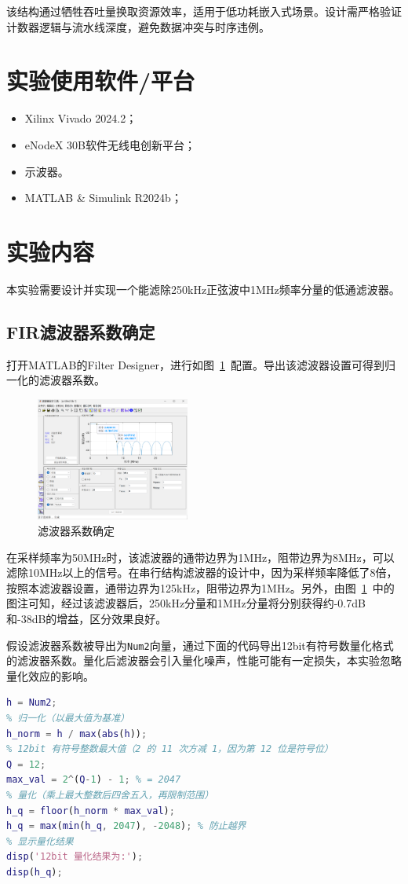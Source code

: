 该结构通过牺牲吞吐量换取资源效率，适用于低功耗嵌入式场景。设计需严格验证计数器逻辑与流水线深度，避免数据冲突与时序违例。
\section{实验使用软件/平台}
\begin{itemize}
    \item Xilinx Vivado 2024.2；
    \item eNodeX 30B软件无线电创新平台；
    \item 示波器。
    \item MATLAB \& Simulink R2024b；
  \end{itemize}
\section{实验内容}

本实验需要设计并实现一个能滤除250kHz正弦波中1MHz频率分量的低通滤波器。

\subsection{FIR滤波器系数确定}
打开MATLAB的\textcolor{blue!50}{Filter Designer}，进行如图~\ref{fig:filterdesign}~配置。导出该滤波器设置可得到归一化的滤波器系数。
\begin{figure}[htbp]
    \centering
    \includegraphics[width=0.45\textwidth]{figure/exp6/filter_designer.png}
    \caption{滤波器系数确定}
    \label{fig:filterdesign}
\end{figure}

在采样频率为50MHz时，该滤波器的通带边界为1MHz，阻带边界为8MHz，可以滤除10MHz以上的信号。在串行结构滤波器的设计中，因为采样频率降低了8倍，按照本滤波器设置，通带边界为125kHz，阻带边界为1MHz。另外，由图~\ref{fig:filterdesign}~中的图注可知，经过该滤波器后，250kHz分量和1MHz分量将分别获得约-0.7dB和-38dB的增益，区分效果良好。

假设滤波器系数被导出为\texttt{Num2}向量，通过下面的代码导出12bit有符号数量化格式的滤波器系数。量化后滤波器会引入量化噪声，性能可能有一定损失，本实验忽略量化效应的影响。
\begin{lstlisting}[language=matlab,caption={滤波器系数12bit量化}]
% 原始滤波器系数
h = Num2;
% 归一化（以最大值为基准）
h_norm = h / max(abs(h));
% 12bit 有符号整数最大值（2 的 11 次方减 1，因为第 12 位是符号位）
Q = 12;
max_val = 2^(Q-1) - 1; % = 2047
% 量化（乘上最大整数后四舍五入，再限制范围）
h_q = floor(h_norm * max_val);
h_q = max(min(h_q, 2047), -2048); % 防止越界
% 显示量化结果
disp('12bit 量化结果为:');
disp(h_q);
\end{lstlisting}
